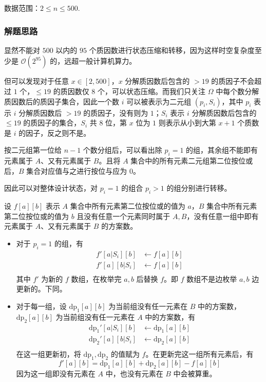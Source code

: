 \documentclass[a4paper, UTF8]{ctexart}
\begin{document}
数据范围：\(2\le n\le 500\).

\subsubsection{解题思路}

显然不能对 \(500\) 以内的 \(95\)
个质因数进行状态压缩和转移，因为这样时空复杂度至少是
\(\mathcal{O}(2^{95})\) 的，远超一般计算机算力。

但可以发现对于任意 \(x\in[2,500]\)，\(x\) 分解质因数后包含的 \(> 19\)
的质因子不会超过 \(1\) 个，\(\le19\) 的质因数仅 \(8\)
个，可以状态压缩。而我们只关注 \(\Omega\)
中每个数分解质因数后的质因子集合，因此一个数 \(i\) 可以被表示为二元组
\((p_i,S_i)\)，其中 \(p_i\) 表示 \(i\) 分解质因数后 \(> 19\)
的质因子，没有则为 \(1\)；\(S_i\) 表示 \(i\) 分解质因数后包含的
\(\le19\) 的质因子的集合，\(S_i\) 共 \(8\) 位，第 \(x\) 位为 \(1\)
则表示从小到大第 \(x+1\) 个质数是 \(i\) 的因子，反之则不是。

按二元组第一位给 \(n-1\) 个数分组后，可以看出除 \(p_i=1\)
的组，其余组不能即有元素属于 \(A\)、又有元素属于 \(B\)。且将 \(A\)
集合中的所有元素二元组第二位按位或后，\(B\) 集合对应值与之进行按位与应为
\(0\)。

因此可以对整体设计状态，对 \(p_i=1\) 的组合 \(p_i > 1\)
的组分别进行转移。

设 \(f[a][b]\) 表示 \(A\) 集合中所有元素第二位按位或的值为 \(a\)，\(B\)
集合中所有元素第二位按位或的值为 \(b\) 且没有任意一个元素同时属于
\(A,B\)，没有任意一组中即有元素属于 \(A\)、又有元素属于 \(B\) 的方案数。

\begin{itemize}
\item
  对于 \(p_i=1\) 的组，有 \[
  \begin{aligned}
  f'[a|S_i][b]&\leftarrow f[a][b]\\
  f'[a][b|S_i]&\leftarrow f[a][b]\\
  \end{aligned}
  \] 其中 \(f'\) 为新的 \(f\) 数组，在枚举完 \(a,b\) 后替换 \(f\)。即
  \(f\) 数组不是边枚举 \(a,b\) 边更新的。下同。
\item
  对于每一组，设 \(\operatorname{dp_1}[a][b]\) 为当前组没有任一元素在
  \(B\) 中的方案数， \(\operatorname{dp_2}[a][b]\)
  为当前组没有任一元素在 \(A\) 中的方案数，有 \[
  \begin{aligned}
  \operatorname{dp_1}'[a|S_i][b]&\leftarrow \operatorname{dp_1}[a][b]\\
  \operatorname{dp_2}'[a][b|S_i]&\leftarrow \operatorname{dp_2}[a][b]\\
  \end{aligned}
  \] 在这一组更新初，将 \(\operatorname{dp_1},\operatorname{dp_2}\)
  的值赋为 \(f\)。在更新完这一组所有元素后，有 \[
  f'[a][b]=\operatorname{dp_1}[a][b]+\operatorname{dp_2}[a][b]-f[a][b]
  \] 因为这一组即没有元素在 \(A\) 中，也没有元素在 \(B\) 中会被算重。
\end{itemize}
\end{document}
